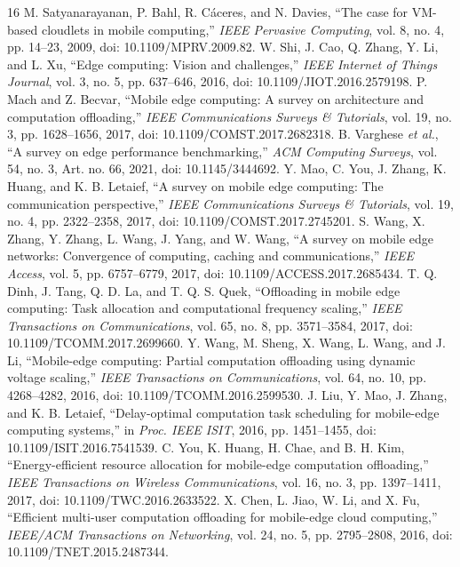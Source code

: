 \documentclass[conference]{IEEEtran}
\begin{document}
        \begin{thebibliography}{16}
         M. Satyanarayanan, P. Bahl, R. C\'aceres, and N. Davies, ``The case for VM-based cloudlets in mobile computing,'' \emph{IEEE Pervasive Computing}, vol. 8, no. 4, pp. 14--23, 2009, doi: 10.1109/MPRV.2009.82.
     W. Shi, J. Cao, Q. Zhang, Y. Li, and L. Xu, ``Edge computing: Vision and challenges,'' \emph{IEEE Internet of Things Journal}, vol. 3, no. 5, pp. 637--646, 2016, doi: 10.1109/JIOT.2016.2579198.
     P. Mach and Z. Becvar, ``Mobile edge computing: A survey on architecture and computation offloading,'' \emph{IEEE Communications Surveys \& Tutorials}, vol. 19, no. 3, pp. 1628--1656, 2017, doi: 10.1109/COMST.2017.2682318.
     B. Varghese \emph{et al.}, ``A survey on edge performance benchmarking,'' \emph{ACM Computing Surveys}, vol. 54, no. 3, Art. no. 66, 2021, doi: 10.1145/3444692.
     Y. Mao, C. You, J. Zhang, K. Huang, and K. B. Letaief, ``A survey on mobile edge computing: The communication perspective,'' \emph{IEEE Communications Surveys \& Tutorials}, vol. 19, no. 4, pp. 2322--2358, 2017, doi: 10.1109/COMST.2017.2745201.
     S. Wang, X. Zhang, Y. Zhang, L. Wang, J. Yang, and W. Wang, ``A survey on mobile edge networks: Convergence of computing, caching and communications,'' \emph{IEEE Access}, vol. 5, pp. 6757--6779, 2017, doi: 10.1109/ACCESS.2017.2685434.
     T. Q. Dinh, J. Tang, Q. D. La, and T. Q. S. Quek, ``Offloading in mobile edge computing: Task allocation and computational frequency scaling,'' \emph{IEEE Transactions on Communications}, vol. 65, no. 8, pp. 3571--3584, 2017, doi: 10.1109/TCOMM.2017.2699660.
     Y. Wang, M. Sheng, X. Wang, L. Wang, and J. Li, ``Mobile-edge computing: Partial computation offloading using dynamic voltage scaling,'' \emph{IEEE Transactions on Communications}, vol. 64, no. 10, pp. 4268--4282, 2016, doi: 10.1109/TCOMM.2016.2599530.
     J. Liu, Y. Mao, J. Zhang, and K. B. Letaief, ``Delay-optimal computation task scheduling for mobile-edge computing systems,'' in \emph{Proc. IEEE ISIT}, 2016, pp. 1451--1455, doi: 10.1109/ISIT.2016.7541539.
     C. You, K. Huang, H. Chae, and B. H. Kim, ``Energy-efficient resource allocation for mobile-edge computation offloading,'' \emph{IEEE Transactions on Wireless Communications}, vol. 16, no. 3, pp. 1397--1411, 2017, doi: 10.1109/TWC.2016.2633522.
     X. Chen, L. Jiao, W. Li, and X. Fu, ``Efficient multi-user computation offloading for mobile-edge cloud computing,'' \emph{IEEE/ACM Transactions on Networking}, vol. 24, no. 5, pp. 2795--2808, 2016, doi: 10.1109/TNET.2015.2487344.

\end{thebibliography}
\end{document}
